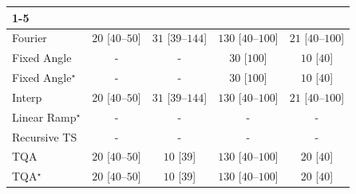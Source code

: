 \begin{tabular}{l|cccc|}
\cline{1-5}
\multicolumn{5}{c}{\rule{0pt}{8pt}PP} \\
\midrule
Fourier & {\cellcolor[HTML]{F5FBF3}} \color[HTML]{000000} $20$ [$40$--$50$] & {\cellcolor[HTML]{F4FBF1}} \color[HTML]{000000} $31$ [$39$--$144$] & {\cellcolor[HTML]{DFF3DA}} \color[HTML]{000000} $130$ [$40$--$100$] & {\cellcolor[HTML]{F5FBF3}} \color[HTML]{000000} $21$ [$40$--$100$] \\
Fixed Angle & {\cellcolor[HTML]{000000}} \color[HTML]{F1F1F1} {\cellcolor{white}} \color{black} - & {\cellcolor[HTML]{000000}} \color[HTML]{F1F1F1} {\cellcolor{white}} \color{black} - & {\cellcolor[HTML]{F4FBF1}} \color[HTML]{000000} $30$ [$100$] & {\cellcolor[HTML]{F7FCF5}} \color[HTML]{000000} $10$ [$40$] \\
Fixed Angle$^\star$ & {\cellcolor[HTML]{000000}} \color[HTML]{F1F1F1} {\cellcolor{white}} \color{black} - & {\cellcolor[HTML]{000000}} \color[HTML]{F1F1F1} {\cellcolor{white}} \color{black} - & {\cellcolor[HTML]{F4FBF1}} \color[HTML]{000000} $30$ [$100$] & {\cellcolor[HTML]{F7FCF5}} \color[HTML]{000000} $10$ [$40$] \\
Interp & {\cellcolor[HTML]{F5FBF3}} \color[HTML]{000000} $20$ [$40$--$50$] & {\cellcolor[HTML]{F4FBF1}} \color[HTML]{000000} $31$ [$39$--$144$] & {\cellcolor[HTML]{DFF3DA}} \color[HTML]{000000} $130$ [$40$--$100$] & {\cellcolor[HTML]{F5FBF3}} \color[HTML]{000000} $21$ [$40$--$100$] \\
Linear Ramp$^\star$ & {\cellcolor[HTML]{000000}} \color[HTML]{F1F1F1} {\cellcolor{white}} \color{black} - & {\cellcolor[HTML]{000000}} \color[HTML]{F1F1F1} {\cellcolor{white}} \color{black} - & {\cellcolor[HTML]{000000}} \color[HTML]{F1F1F1} {\cellcolor{white}} \color{black} - & {\cellcolor[HTML]{000000}} \color[HTML]{F1F1F1} {\cellcolor{white}} \color{black} - \\
Recursive TS & {\cellcolor[HTML]{000000}} \color[HTML]{F1F1F1} {\cellcolor{white}} \color{black} - & {\cellcolor[HTML]{000000}} \color[HTML]{F1F1F1} {\cellcolor{white}} \color{black} - & {\cellcolor[HTML]{000000}} \color[HTML]{F1F1F1} {\cellcolor{white}} \color{black} - & {\cellcolor[HTML]{000000}} \color[HTML]{F1F1F1} {\cellcolor{white}} \color{black} - \\
TQA & {\cellcolor[HTML]{F5FBF3}} \color[HTML]{000000} $20$ [$40$--$50$] & {\cellcolor[HTML]{F7FCF5}} \color[HTML]{000000} $10$ [$39$] & {\cellcolor[HTML]{DFF3DA}} \color[HTML]{000000} $130$ [$40$--$100$] & {\cellcolor[HTML]{F5FBF3}} \color[HTML]{000000} $20$ [$40$] \\
TQA$^\star$ & {\cellcolor[HTML]{F5FBF3}} \color[HTML]{000000} $20$ [$40$--$50$] & {\cellcolor[HTML]{F7FCF5}} \color[HTML]{000000} $10$ [$39$] & {\cellcolor[HTML]{DFF3DA}} \color[HTML]{000000} $130$ [$40$--$100$] & {\cellcolor[HTML]{F5FBF3}} \color[HTML]{000000} $20$ [$40$] \\

\end{tabular}

